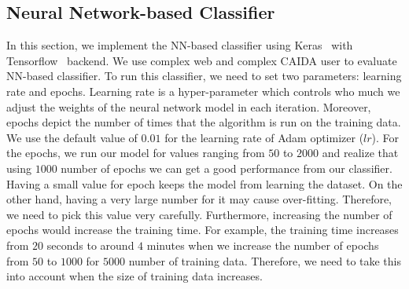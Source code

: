 \subsection{Neural Network-based Classifier}

In this section, we implement the NN-based classifier using Keras~\cite{keras} with Tensorflow~\cite{tensorflow2015-whitepaper} backend. We use complex web and complex CAIDA user to evaluate NN-based classifier. To run this classifier, we need to set two parameters: learning rate and epochs. Learning rate is a hyper-parameter which controls who much we adjust the weights of the neural network model in each iteration. Moreover, epochs depict the number of times that the algorithm is run on the training data. We use the default value of $0.01$ for the learning rate of Adam optimizer ($lr$). For the epochs, we run our model for values ranging from $50$ to $2000$ and realize that using $1000$ number of epochs we can get a good performance from our classifier. Having a small value for epoch keeps the model from learning the dataset. On the other hand, having a very large number for it may cause over-fitting. Therefore, we need to pick this value very carefully. Furthermore, increasing the number of epochs would increase the training time. For example, the training time increases from $20$ seconds to around $4$ minutes when we increase the number of epochs from $50$ to $1000$ for $5000$ number of training data. Therefore, we need to take this into account when the size of training data increases.

